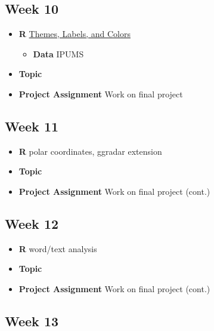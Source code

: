 \documentclass[]{book}
\providecommand{\tightlist}{%
  \setlength{\itemsep}{0pt}\setlength{\parskip}{0pt}}
\theoremstyle{definition}
\theoremstyle{definition}
\theoremstyle{remark}
\begin{document}
\subsection*{Week 10}\label{week-10}

\begin{itemize}
\tightlist
\item
  \textbf{R} \protect\hyperlink{themes-labels-colors}{Themes, Labels,
  and Colors}

  \begin{itemize}
  \tightlist
  \item
    \textbf{Data} IPUMS 
  \end{itemize}
\item
  \textbf{Topic}
\item
  \textbf{Project Assignment} Work on final project
\end{itemize}

\subsection*{Week 11}\label{week-11}

\begin{itemize}
\tightlist
\item
  \textbf{R} polar coordinates, ggradar extension 
\item
  \textbf{Topic}
\item
  \textbf{Project Assignment} Work on final project (cont.)
\end{itemize}

\subsection*{Week 12}\label{week-12}

\begin{itemize}
\tightlist
\item
  \textbf{R} word/text analysis 
\item
  \textbf{Topic}
\item
  \textbf{Project Assignment} Work on final project (cont.)
\end{itemize}

\subsection*{Week 13}\label{week-13}
\end{document}
